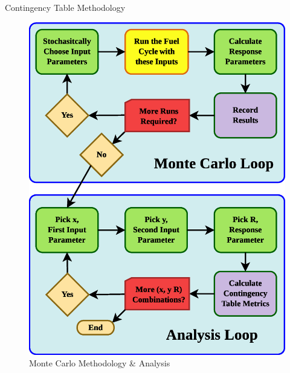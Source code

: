 \documentclass[pdf, autumn, slideColor, nocolorBG]{prosper}
\begin{document}
\begin{slide}{Contingency Table Methodology}
\begin{center}
\begin{figure}
\caption{Monte Carlo Methodology \& Analysis}
\includegraphics[scale=0.25]{../ct_sensitivity/figs/MonteCarloMethodology.eps}
\end{figure}
\end{center}
\end{slide}
\end{document}
